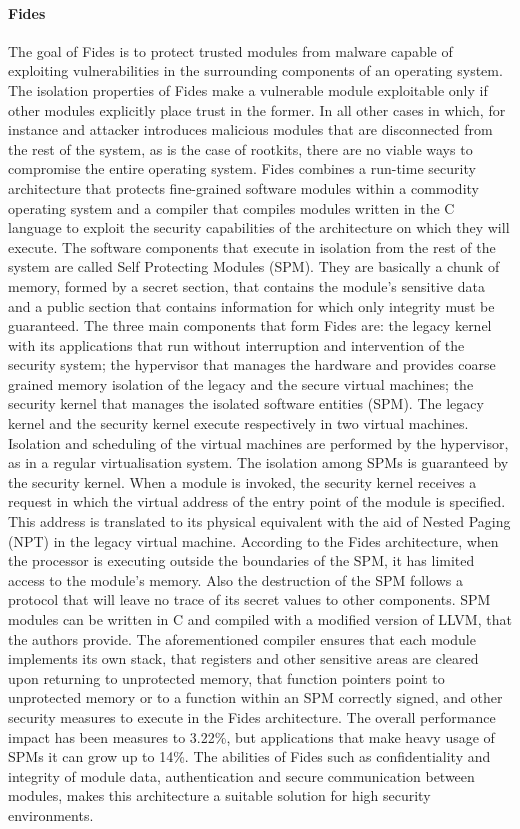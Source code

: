 \paragraph{Fides}
The goal of Fides \cite{fides} is to protect trusted modules from malware capable of exploiting vulnerabilities in the surrounding components of an operating system. The isolation properties of Fides make a vulnerable module exploitable only if other modules explicitly place trust in the former. In all other cases in which, for instance and attacker introduces malicious modules that are disconnected from the rest of the system, as is the case of rootkits, there are no viable ways to compromise the entire operating system. 
Fides combines a run-time security architecture that protects fine-grained software modules within a commodity operating system and a compiler that compiles modules written in the C language to exploit the security capabilities of the architecture on which they will execute.
The software components that execute in isolation from the rest of the system are called Self Protecting Modules (SPM). They are basically a chunk of memory, formed by a secret section, that contains the module's sensitive data and a public section that contains information for which only integrity must be guaranteed. 
The three main components that form Fides are: the legacy kernel with its applications that run without interruption and intervention of the security system; the hypervisor that manages the hardware and provides coarse grained memory isolation of the legacy and the secure virtual machines; the security kernel that manages the isolated software entities (SPM). The legacy kernel and the security kernel execute respectively in two virtual machines. Isolation and scheduling of the virtual machines are performed by the hypervisor, as in a regular virtualisation system.
The isolation among SPMs is guaranteed by the security kernel. When a module is invoked, the security kernel receives a request in which the virtual address of the entry point of the module is specified. This address is translated to its physical equivalent with the aid of Nested Paging (NPT) in the legacy virtual machine.
According to the Fides architecture, when the processor is executing outside the boundaries of the SPM, it has limited access to the module's memory. Also the destruction of the SPM follows a protocol that will leave no trace of its secret values to other components. 
SPM modules can be written in C and compiled with a modified version of LLVM, that the authors provide. The aforementioned compiler ensures that each module implements its own stack, that registers and other sensitive areas are cleared upon returning to unprotected memory, that function pointers point to unprotected memory or to a function within an SPM correctly signed, and other security measures to execute in the Fides architecture.
The overall performance impact has been measures to 3.22\%, but applications that make heavy usage of SPMs it can grow up to 14\%.
The abilities of Fides such as confidentiality and integrity of module data, authentication and secure communication between modules, makes this architecture a suitable solution for high security environments.



